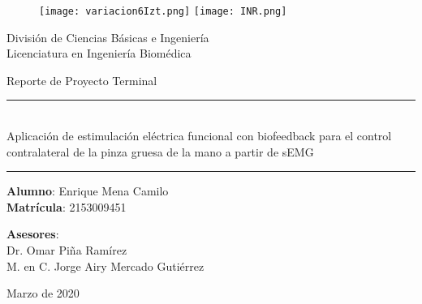 \begin{titlepage}
\begin{center}

\begin{figure}
	\centering
	\texttt{[image: variacion6Izt.png]}
	\hfill
	\texttt{[image: INR.png]}
\end{figure}

\LARGE{División de Ciencias Básicas e Ingeniería\\Licenciatura en Ingeniería Biomédica\\}

\vspace*{\fill}
\LARGE{Reporte de Proyecto Terminal}

\vspace*{\fill}

\rule{16.5cm}{0.5mm}\\
\LARGE{Aplicación de estimulación eléctrica funcional con biofeedback para el control contralateral de la pinza gruesa de la mano a partir de sEMG}\\
\rule{16.5cm}{0.5mm}

\vspace*{\fill}

\LARGE{	\textbf{Alumno}: Enrique Mena Camilo\\
		\textbf{Matrícula}: 2153009451\\}

\vspace*{\fill}

\LARGE{\textbf{Asesores}:\\Dr. Omar Piña Ramírez\\M. en C. Jorge Airy Mercado Gutiérrez}

\vspace*{\fill}

\Large{Marzo de 2020}

\end{center}
\end{titlepage}